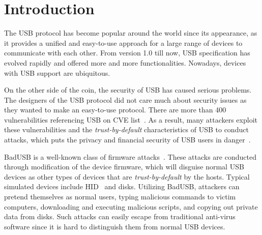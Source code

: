 \section{Introduction}
\label{sec:introduction}

The \ac{USB} protocol has become popular around the world
since its appearance, as it provides a unified and easy-to-use approach for a
large range of devices to communicate with each other.  From version 1.0 till
now, \ac{USB} specification has evolved rapidly and offered more and more
functionalities.  Nowadays, devices with \ac{USB} support are ubiquitous.

On the other side of the coin, the security of \ac{USB} has caused serious problems.
The designers of the \ac{USB} protocol did not care much about security issues as
they wanted to make an easy-to-use protocol.  There are more than 400
vulnerabilities referencing \ac{USB} on CVE list~\cite{website:CVE-list}.  As a
result, many attackers exploit these vulnerabilities and the
\textit{trust-by-default} characteristics of \ac{USB} to conduct attacks, which puts
the privacy and financial security of \ac{USB} users in danger~\cite{sok}.

BadUSB is a well-known class of firmware attacks~\cite{badusb}.  These attacks
are conducted through modification of the device firmware, which will disguise
normal \ac{USB} devices as other types of devices that are \textit{trust-by-default}
by the hosts.  Typical simulated devices include \ac{HID}~\cite{hid} and disks.  Utilizing BadUSB,
attackers can pretend themselves as normal users, typing malicious commands to
victim computers, downloading and executing malicious scripts, and copying out
private data from disks.  Such attacks can easily escape from traditional
anti-virus software since it is hard to distinguish them from normal \ac{USB}
devices.

